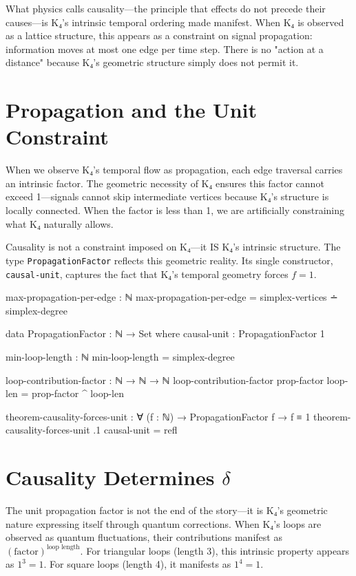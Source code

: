 \documentclass[11pt,a4paper]{book}
\begin{document}
What physics calls causality—the principle that effects do not precede their causes—is K₄'s intrinsic temporal ordering made manifest. When K₄ is observed as a lattice structure, this appears as a constraint on signal propagation: information moves at most one edge per time step. There is no "action at a distance" because K₄'s geometric structure simply does not permit it.

\section{Propagation and the Unit Constraint}

When we observe K₄'s temporal flow as propagation, each edge traversal carries an intrinsic factor. The geometric necessity of K₄ ensures this factor cannot exceed 1—signals cannot skip intermediate vertices because K₄'s structure is locally connected. When the factor is less than 1, we are artificially constraining what K₄ naturally allows.

Causality is not a constraint imposed on K₄—it IS K₄'s intrinsic structure. The type \texttt{PropagationFactor} reflects this geometric reality. Its single constructor, \texttt{causal-unit}, captures the fact that K₄'s temporal geometry forces $f = 1$.

\begin{code}
max-propagation-per-edge : ℕ
max-propagation-per-edge = simplex-vertices ∸ simplex-degree

data PropagationFactor : ℕ → Set where
  causal-unit : PropagationFactor 1

min-loop-length : ℕ
min-loop-length = simplex-degree

loop-contribution-factor : ℕ → ℕ → ℕ
loop-contribution-factor prop-factor loop-len = prop-factor ^ loop-len

theorem-causality-forces-unit : ∀ (f : ℕ) → 
  PropagationFactor f → f ≡ 1
theorem-causality-forces-unit .1 causal-unit = refl
\end{code}

\section{Causality Determines \texorpdfstring{$\delta$}{delta}}

The unit propagation factor is not the end of the story—it is K₄'s geometric nature expressing itself through quantum corrections. When K₄'s loops are observed as quantum fluctuations, their contributions manifest as $(\text{factor})^{\text{loop length}}$. For triangular loops (length 3), this intrinsic property appears as $1^3 = 1$. For square loops (length 4), it manifests as $1^4 = 1$.
\end{document}
